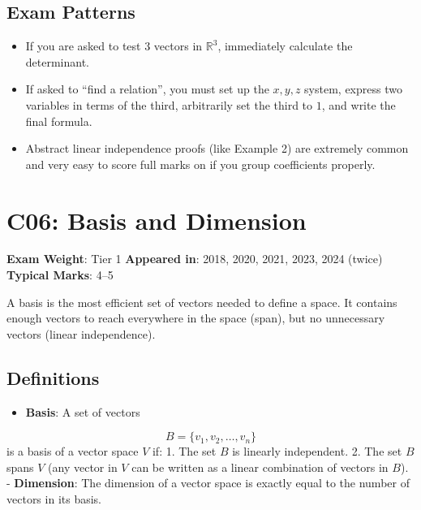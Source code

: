 \documentclass[
]{article}
\providecommand{\tightlist}{%
  \setlength{\itemsep}{0pt}\setlength{\parskip}{0pt}}
\renewenvironment{quote}
  {\begin{tcolorbox}[
     colback=calloutbg,
     colframe=calloutframe,
     colupper=callouttext,
     arc=3pt,
     boxrule=0.5pt,
     leftrule=0.5pt,
     borderline west={3pt}{0pt}{calloutaccent},
     left=8pt,
     right=8pt,
     top=6pt,
     bottom=6pt
   ]}
  {\end{tcolorbox}}
\begin{document}
\subsection{Exam Patterns}\label{exam-patterns-33}

\begin{itemize}
\tightlist
\item
  If you are asked to test 3 vectors in \(\mathbb{R}^3\), immediately
  calculate the determinant.
\item
  If asked to ``find a relation'', you must set up the \(x, y, z\)
  system, express two variables in terms of the third, arbitrarily set
  the third to \(1\), and write the final formula.
\item
  Abstract linear independence proofs (like Example 2) are extremely
  common and very easy to score full marks on if you group coefficients
  properly.
\end{itemize}

\section{C06: Basis and Dimension}\label{c06-basis-and-dimension}

\begin{quote}
\textbf{Exam Weight}: Tier 1 \textbar{} \textbf{Appeared in}: 2018,
2020, 2021, 2023, 2024 (twice) \textbar{} \textbf{Typical Marks}: 4--5
\end{quote}

A basis is the most efficient set of vectors needed to define a space.
It contains enough vectors to reach everywhere in the space (span), but
no unnecessary vectors (linear independence).

\subsection{Definitions}\label{definitions-1}

\begin{itemize}
\tightlist
\item
  \textbf{Basis}: A set of vectors
\end{itemize}
\[
B = \lbrace v_1, v_2, \dots, v_n\rbrace
\]
is a basis of a vector space \(V\) if: 1. The set \(B\) is linearly
independent. 2. The set \(B\) spans \(V\) (any vector in \(V\) can be
written as a linear combination of vectors in \(B\)). -
\textbf{Dimension}: The dimension of a vector space is exactly equal to
the number of vectors in its basis.
\end{document}
